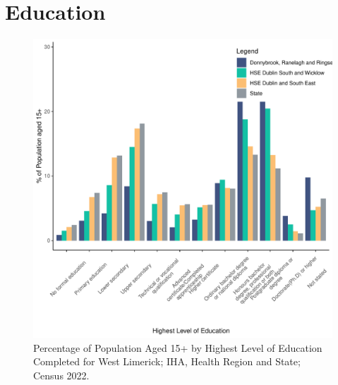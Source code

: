 \documentclass{article}
\begin{document}
\section{Education}\label{sect:Edu}
\begin{figure}[H]
	\centering
	\includegraphics[width = 120mm]{../figures/EduED.pdf}
	\caption{Percentage of Population Aged 15+ by Highest Level of Education Completed for West Limerick; IHA, Health Region and State; Census 2022.}
	\label{fig:vbnv}
	\end{figure}
\end{document}
